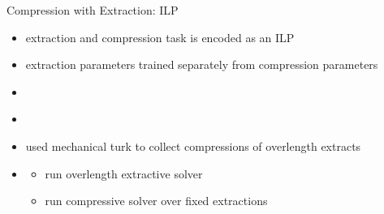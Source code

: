 \documentclass[xcolor={table}]{beamer}
\begin{document}
\begin{frame}{Compression with Extraction: ILP}
    \textbf{\cite{martins2009summarization} }
    \begin{itemize}
    \item  extraction and compression task is encoded as an ILP
    \item extraction parameters trained separately from compression parameters
    \item {}
    \end{itemize}

    \textbf{\cite{berg2011jointly} }
    \begin{itemize}
        \item {}
    \item used mechanical turk to collect compressions of overlength extracts
    \item {}
        \begin{itemize}
            \item run overlength extractive solver
            \item run compressive solver over fixed extractions
        \end{itemize}
    \end{itemize}
\end{frame}
\end{document}
